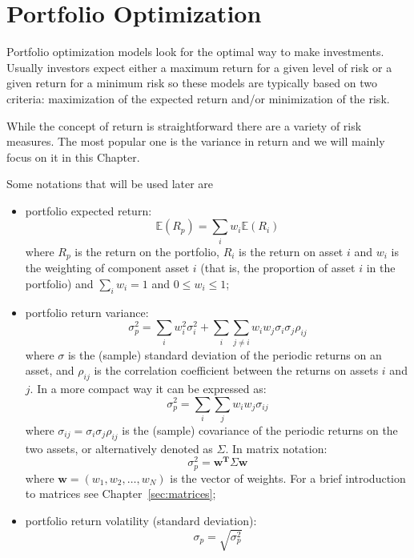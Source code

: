 \chapter{Portfolio Optimization}\label{portfolio-optimization}

Portfolio optimization models look for the optimal way to make investments. Usually investors expect either a maximum return for a given level of risk or a given return for a minimum risk so these models are typically based on two criteria: maximization of the expected return and/or minimization of the risk.

While the concept of return is straightforward there are a variety of risk measures. The most popular one is the variance in return and we will mainly focus on it in this Chapter.

Some notations that will be used later are

\begin{itemize}
\tightlist
\item
  portfolio expected return: 
  \begin{equation} 
  	\mathbb{E}(R_{p}) = \sum _{i}w_{i} \mathbb{E}(R_{i}) 
  \end{equation} 
  where \(R_{p}\) is the return on the portfolio, \(R_{i}\) is the return on asset \(i\) and \(w_{i}\) is the weighting of component asset \(i\) (that is, the proportion of asset \(i\) in the portfolio) and \(\sum_{i}w_i = 1\) and \(0 \le w_i \le 1\);
\item
  portfolio return variance:
  \begin{equation} 
 	\sigma _{p}^{2} = \sum _{i}w_{i}^{2}\sigma _{i}^{2} + \sum _{i}\sum _{j\neq i}w_{i}w_{j}\sigma _{i}\sigma _{j}\rho _{ij} \end{equation}
  where \(\sigma\) is the (sample) standard deviation of the periodic returns on an asset, and \(\rho _{ij}\) is the correlation coefficient between the returns on assets \(i\) and \(j\). In a more compact way it can be expressed as:
  \begin{equation} 
  	\sigma _{p}^{2}=\sum _{i}\sum _{j}w_{i}w_{j}\sigma _{ij} 
  \end{equation} 
  where \(\sigma _{ij}=\sigma _{i}\sigma _{j}\rho _{ij}\) is the (sample) covariance of the periodic returns on the two assets, or alternatively denoted as \(\Sigma\). In matrix notation:
  \begin{equation}
  	\sigma_p^2 = \mathbf{w^T}\Sigma\mathbf{w} 
  \end{equation}
  where $\mathbf{w} = (w_1,w_2,\ldots,w_N)$ is the vector of weights. For a brief introduction to matrices see Chapter~\ref{sec:matrices};
\item
  portfolio return volatility (standard deviation):
  \begin{equation}
  	\sigma _{p}= \sqrt{\sigma _{p}^{2}}
  \end{equation}
\end{itemize}

